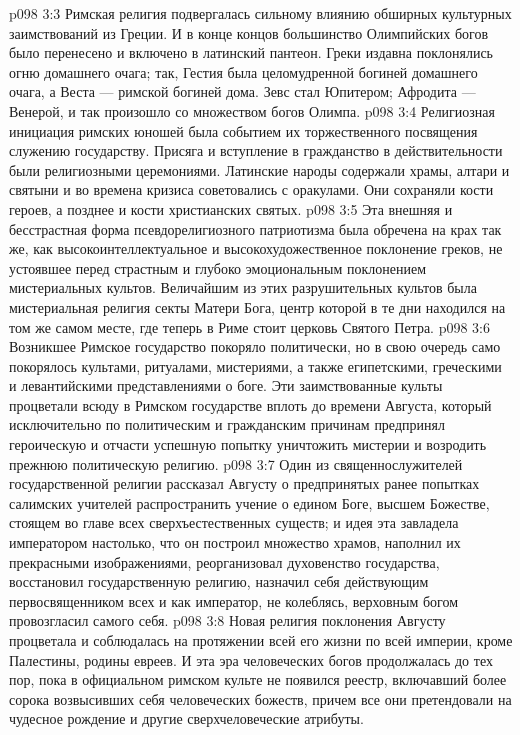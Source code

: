 \vs p098 3:3 Римская религия подвергалась сильному влиянию обширных культурных заимствований из Греции. И в конце концов большинство Олимпийских богов было перенесено и включено в латинский пантеон. Греки издавна поклонялись огню домашнего очага; так, Гестия была целомудренной богиней домашнего очага, а Веста --- римской богиней дома. Зевс стал Юпитером; Афродита --- Венерой, и так произошло со множеством богов Олимпа.
\vs p098 3:4 Религиозная инициация римских юношей была событием их торжественного посвящения служению государству. Присяга и вступление в гражданство в действительности были религиозными церемониями. Латинские народы содержали храмы, алтари и святыни и во времена кризиса советовались с оракулами. Они сохраняли кости героев, а позднее и кости христианских святых.
\vs p098 3:5 Эта внешняя и бесстрастная форма псевдорелигиозного патриотизма была обречена на крах так же, как высокоинтеллектуальное и высокохудожественное поклонение греков, не устоявшее перед страстным и глубоко эмоциональным поклонением мистериальных культов. Величайшим из этих разрушительных культов была мистериальная религия секты Матери Бога, центр которой в те дни находился на том же самом месте, где теперь в Риме стоит церковь Святого Петра.
\vs p098 3:6 \pc Возникшее Римское государство покоряло политически, но в свою очередь само покорялось культами, ритуалами, мистериями, а также египетскими, греческими и левантийскими представлениями о боге. Эти заимствованные культы процветали всюду в Римском государстве вплоть до времени Августа, который исключительно по политическим и гражданским причинам предпринял героическую и отчасти успешную попытку уничтожить мистерии и возродить прежнюю политическую религию.
\vs p098 3:7 Один из священнослужителей государственной религии рассказал Августу о предпринятых ранее попытках салимских учителей распространить учение о едином Боге, высшем Божестве, стоящем во главе всех сверхъестественных существ; и идея эта завладела императором настолько, что он построил множество храмов, наполнил их прекрасными изображениями, реорганизовал духовенство государства, восстановил государственную религию, назначил себя действующим первосвященником всех и как император, не колеблясь, верховным богом провозгласил самого себя.
\vs p098 3:8 Новая религия поклонения Августу процветала и соблюдалась на протяжении всей его жизни по всей империи, кроме Палестины, родины евреев. И эта эра человеческих богов продолжалась до тех пор, пока в официальном римском культе не появился реестр, включавший более сорока возвысивших себя человеческих божеств, причем все они претендовали на чудесное рождение и другие сверхчеловеческие атрибуты.
